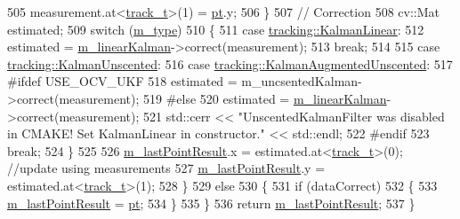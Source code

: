 \begin{DoxyCode}
505             measurement.at<\mbox{\hyperlink{defines_8h_a7ce9c8817b42ab418e61756f579549ab}{track\_t}}>(1) = \mbox{\hyperlink{rings_8cpp_af69bbacaaf68a115b351c5d1e29c3cc8}{pt}}.y;
506         \}
507         \textcolor{comment}{// Correction}
508         cv::Mat estimated;
509         \textcolor{keywordflow}{switch} (\mbox{\hyperlink{class_t_kalman_filter_a00cabc6683f6cc848559515df46d7101}{m\_type}})
510         \{
511         \textcolor{keywordflow}{case} \mbox{\hyperlink{namespacetracking_a83f2c4d58ea2737f7d6296dce3eb722aa889eca583e371386c92e05814797a885}{tracking::KalmanLinear}}:
512             estimated = \mbox{\hyperlink{class_t_kalman_filter_aec607aacb57ef1f78e514c6b3ef18435}{m\_linearKalman}}->correct(measurement);
513             \textcolor{keywordflow}{break};
514 
515         \textcolor{keywordflow}{case} \mbox{\hyperlink{namespacetracking_a83f2c4d58ea2737f7d6296dce3eb722aa39d914d61ae37e52ad325f55d199dabc}{tracking::KalmanUnscented}}:
516         \textcolor{keywordflow}{case} \mbox{\hyperlink{namespacetracking_a83f2c4d58ea2737f7d6296dce3eb722aa442bc8be9c68f72f1bc7952153cbf4c7}{tracking::KalmanAugmentedUnscented}}:
517 \textcolor{preprocessor}{#ifdef USE\_OCV\_UKF}
518             estimated = m\_uncsentedKalman->correct(measurement);
519 \textcolor{preprocessor}{#else}
520             estimated = \mbox{\hyperlink{class_t_kalman_filter_aec607aacb57ef1f78e514c6b3ef18435}{m\_linearKalman}}->correct(measurement);
521             std::cerr << \textcolor{stringliteral}{"UnscentedKalmanFilter was disabled in CMAKE! Set KalmanLinear in constructor."} <<
       std::endl;
522 \textcolor{preprocessor}{#endif}
523             \textcolor{keywordflow}{break};
524         \}
525 
526         \mbox{\hyperlink{class_t_kalman_filter_a91efb6a00cfae5df3e513ceba2239fa3}{m\_lastPointResult}}.x = estimated.at<\mbox{\hyperlink{defines_8h_a7ce9c8817b42ab418e61756f579549ab}{track\_t}}>(0);   \textcolor{comment}{//update using
       measurements}
527         \mbox{\hyperlink{class_t_kalman_filter_a91efb6a00cfae5df3e513ceba2239fa3}{m\_lastPointResult}}.y = estimated.at<\mbox{\hyperlink{defines_8h_a7ce9c8817b42ab418e61756f579549ab}{track\_t}}>(1);
528     \}
529     \textcolor{keywordflow}{else}
530     \{
531         \textcolor{keywordflow}{if} (dataCorrect)
532         \{
533             \mbox{\hyperlink{class_t_kalman_filter_a91efb6a00cfae5df3e513ceba2239fa3}{m\_lastPointResult}} = \mbox{\hyperlink{rings_8cpp_af69bbacaaf68a115b351c5d1e29c3cc8}{pt}};
534         \}
535     \}
536     \textcolor{keywordflow}{return} \mbox{\hyperlink{class_t_kalman_filter_a91efb6a00cfae5df3e513ceba2239fa3}{m\_lastPointResult}};
537 \}
\end{DoxyCode}
